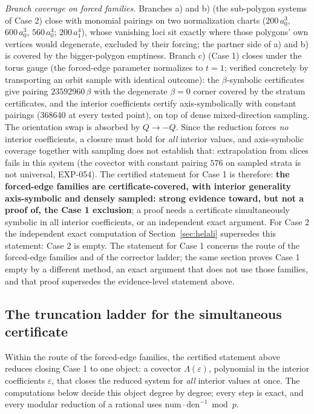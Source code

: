\documentclass[11pt]{article}
\theoremstyle{remark}
\begin{document}
\emph{Branch coverage on forced families.} Branches a) and b) (the sub-polygon systems of Case 2) close with monomial
pairings on two normalization charts ($200\,a_0^3$, $600\,a_0^3$, $560\,a_0^4$;
$200\,a_1^4$), whose vanishing loci sit exactly where those polygons' own vertices
would degenerate, excluded by their forcing; the partner side of a) and b) is covered by the
bigger-polygon emptiness. Branch c) (Case 1) closes under the torus gauge (the forced-edge
parameter normalizes to $t = 1$; verified concretely by transporting an orbit sample
with identical outcome): the $\beta$-symbolic certificates give pairing
$23592960\,\beta$ with the degenerate $\beta = 0$ corner covered by the stratum
certificates, and the interior coefficients certify axis-symbolically with constant
pairings ($368640$ at every tested point), on top of dense mixed-direction sampling.
The orientation swap is absorbed by $Q \to -Q$. Since the reduction forces \emph{no}
interior coefficients, a closure must hold for \emph{all} interior values, and
axis-symbolic coverage together with sampling does not establish that: extrapolation from
slices fails in this system (the covector with constant pairing $576$ on sampled strata is
not universal, EXP-054). The certified statement for Case 1 is therefore: \textbf{the forced-edge
families are certificate-covered, with interior
generality axis-symbolic and densely sampled: strong evidence toward, but not a proof
of, the Case 1 exclusion}; a proof needs a certificate
simultaneously symbolic in all interior coefficients, or an independent exact argument.
For Case 2 the independent exact computation of Section~\ref{sec:helali} supersedes this statement: Case 2 is empty. The statement for Case 1 concerns the route of the forced-edge families and of the corrector ladder; the same section
proves Case 1 empty by a different method, an exact argument that does not use those families, and that proof supersedes the evidence-level statement above.
\subsection{The truncation ladder for the simultaneous certificate}\label{sec:ladder}

Within the route of the forced-edge families, the certified statement above reduces closing Case 1 to one object: a covector
$\Lambda(\varepsilon)$, polynomial in the interior coefficients $\varepsilon$,
that closes the reduced system for \emph{all} interior values at once. The
computations below decide this object degree by degree; every step is
exact, and every modular reduction of a rational uses $\mathrm{num}\cdot
\mathrm{den}^{-1} \bmod p$.
\end{document}

